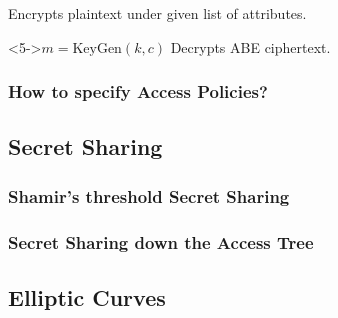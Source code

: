 \begin{frame}[c]
\begin{minipage}[t]{0.49\textwidth}
\begin{block}
            \centering
            Encrypts plaintext under given list of attributes.
        \end{block}
        \vspace{0.5cm}
        \begin{block}<5->{\centering $m = \text{KeyGen}(k, c)$}
            \centering
            Decrypts ABE ciphertext.
        \end{block}
    \end{minipage}
\end{frame}

\begin{frame}[c]
    \frametitle{How to specify Access Policies?}
    
\end{frame}

\subsection{Secret Sharing}
\begin{frame}[c]
    \frametitle{Shamir's threshold Secret Sharing}
    
\end{frame}

\begin{frame}
    \frametitle{Secret Sharing down the Access Tree}
    
\end{frame}


\subsection{Elliptic Curves}

